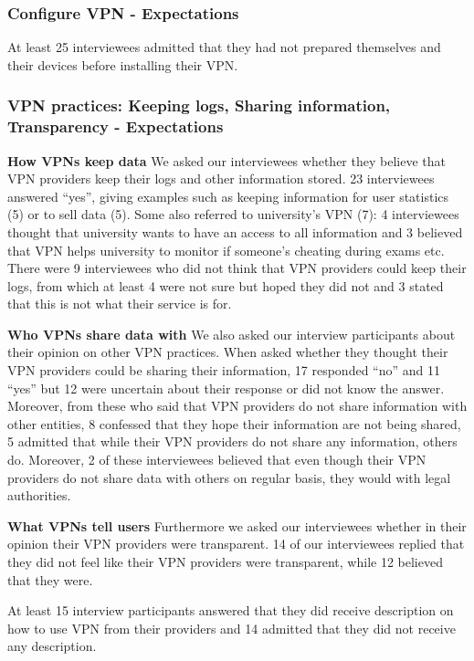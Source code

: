 \subsubsection{Configure VPN - Expectations}
At least 25 interviewees admitted that they had not prepared themselves and their devices before installing their VPN.

\subsubsection{VPN practices: Keeping logs, Sharing information, Transparency - Expectations} 
\textbf{How VPNs keep data}
We asked our interviewees whether they believe that VPN providers keep their logs and other information stored. 23 interviewees answered “yes”, giving examples such as keeping information for user statistics (5) or to sell data (5). Some also referred to university’s VPN (7): 4 interviewees thought that university wants to have an access to all information and 3 believed that VPN helps university to monitor if someone’s cheating during exams etc. There were 9 interviewees who did not think that VPN providers could keep their logs, from which at least 4 were not sure but hoped they did not and 3 stated that this is not what their service is for.

\textbf{Who VPNs share data with}
We also asked our interview participants about their opinion on other VPN practices. When asked whether they thought their VPN providers could be sharing their information, 17 responded “no” and 11 “yes” but 12 were uncertain about their response or did not know the answer.  Moreover, from these who said that VPN providers do not share information with other entities, 8 confessed that they hope their information are not being shared, 5 admitted that while their VPN providers do not share any information, others do. Moreover, 2 of these interviewees believed that even though their VPN providers do not share data with others on regular basis, they would with legal authorities. 

\textbf{What VPNs tell users}
Furthermore we asked our interviewees whether in their opinion their VPN providers were transparent. 14 of our interviewees replied that they did not feel like their VPN providers were transparent, while 12 believed that they were. 

At least 15 interview participants answered that they did receive description on how to use VPN from their providers and 14 admitted that they did not receive any description.  

